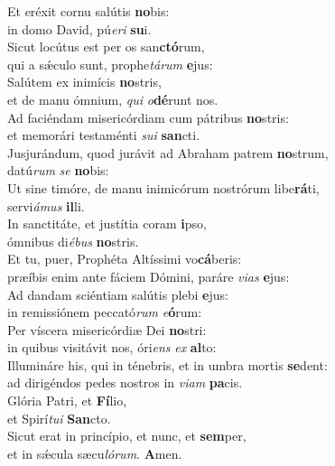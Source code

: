 \evenverse Et eréxit cornu salútis \textbf{no}bis:~\*\\
\evenverse in domo David, pú\textit{e}\textit{ri} \textbf{su}i.\\
\oddverse Sicut locútus est per os san\textbf{ctó}rum,~\*\\
\oddverse qui a sǽculo sunt, prophe\textit{tá}\textit{rum} \textbf{e}jus:\\
\evenverse Salútem ex inimícis \textbf{no}stris,~\*\\
\evenverse et de manu ómnium, \textit{qui} \textit{o}\textbf{dé}runt nos.\\
\oddverse Ad faciéndam misericórdiam cum pátribus \textbf{no}stris:~\*\\
\oddverse et memorári testaménti \textit{su}\textit{i} \textbf{san}cti.\\
\evenverse Jusjurándum, quod jurávit ad Abraham patrem \textbf{no}strum,~\*\\
\evenverse datú\textit{rum} \textit{se} \textbf{no}bis:\\
\oddverse Ut sine timóre, de manu inimicórum nostrórum libe\textbf{rá}ti,~\*\\
\oddverse servi\textit{á}\textit{mus} \textbf{il}li.\\
\evenverse In sanctitáte, et justítia coram \textbf{i}pso,~\*\\
\evenverse ómnibus di\textit{é}\textit{bus} \textbf{no}stris.\\
\oddverse Et tu, puer, Prophéta Altíssimi vo\textbf{cá}beris:~\*\\
\oddverse præíbis enim ante fáciem Dómini, paráre \textit{vi}\textit{as} \textbf{e}jus:\\
\evenverse Ad dandam sciéntiam salútis plebi \textbf{e}jus:~\*\\
\evenverse in remissiónem peccató\textit{rum} \textit{e}\textbf{ó}rum:\\
\oddverse Per víscera misericórdiæ Dei \textbf{no}stri:~\*\\
\oddverse in quibus visitávit nos, óri\textit{ens} \textit{ex} \textbf{al}to:\\
\evenverse Illumináre his, qui in ténebris, et in umbra mortis \textbf{se}dent:~\*\\
\evenverse ad dirigéndos pedes nostros in \textit{vi}\textit{am} \textbf{pa}cis.\\
\oddverse Glória Patri, et \textbf{Fí}lio,~\*\\
\oddverse et Spirí\textit{tu}\textit{i} \textbf{San}cto.\\
\evenverse Sicut erat in princípio, et nunc, et \textbf{sem}per,~\*\\
\evenverse et in sǽcula sæcu\textit{ló}\textit{rum}. \textbf{A}men.\\
